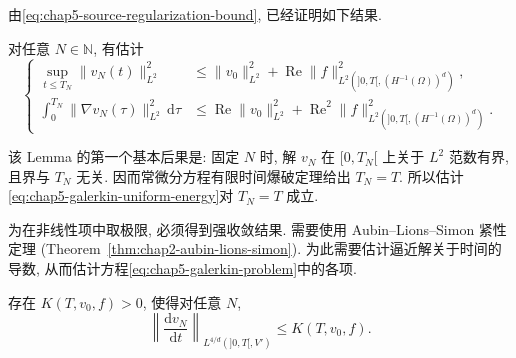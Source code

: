 由\eqref{eq:chap5-source-regularization-bound}, 已经证明如下结果.

\begin{Lemma}
\label{lem:chap5-galerkin-energy-bounds}
对任意 $N\in\mathbb N$, 有估计
\begin{equation}
\left\{
\begin{aligned}
 \sup_{t\leq T_N}\|v_N(t)\|_{L^2}^2
 &\leq\|v_0\|_{L^2}^2
 +\operatorname{Re}\|f\|_{L^2(]0,T[,(H^{-1}(\Omega))^d)}^2,\\
 \int_0^{T_N}\|\nabla v_N(\tau)\|_{L^2}^2\,\mathrm d\tau
 &\leq\operatorname{Re}\|v_0\|_{L^2}^2
 +\operatorname{Re}^2\|f\|_{L^2(]0,T[,(H^{-1}(\Omega))^d)}^2.
\end{aligned}
\right.
\label{eq:chap5-galerkin-uniform-energy}
\end{equation}
\end{Lemma}

该 Lemma 的第一个基本后果是: 固定 $N$ 时, 解 $v_N$ 在 $[0,T_N[$ 上关于 $L^2$ 范数有界, 且界与 $T_N$ 无关. 因而常微分方程有限时间爆破定理给出 $T_N=T$. 所以估计\eqref{eq:chap5-galerkin-uniform-energy}对 $T_N=T$ 成立.

为在非线性项中取极限, 必须得到强收敛结果. 需要使用 Aubin--Lions--Simon 紧性定理 (Theorem~\ref{thm:chap2-aubin-lions-simon}). 为此需要估计逼近解关于时间的导数, 从而估计方程\eqref{eq:chap5-galerkin-problem}中的各项.

\begin{Lemma}
\label{lem:chap5-galerkin-time-derivative}
存在 $K(T,v_0,f)>0$, 使得对任意 $N$,
\[
 \left\|\frac{\mathrm dv_N}{\mathrm dt}\right\|_{L^{4/d}(]0,T[,V')}
 \leq K(T,v_0,f).
\]
\end{Lemma}

